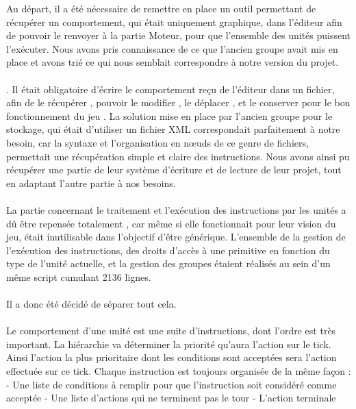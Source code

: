 \documentclass{report}
\begin{document}
Au départ, il a été nécessaire de remettre en place un outil permettant de récupérer un comportement, qui était uniquement graphique, dans l'éditeur afin de pouvoir le renvoyer à la partie Moteur, pour que l'ensemble des unités puissent l'exécuter.
Nous avons pris connaissance de ce que l'ancien groupe avait mis en place et avons trié ce qui nous semblait correspondre à notre version du projet.
\paragraph{}
.
Il était obligatoire d'écrire le comportement reçu de l'éditeur dans un fichier, afin de le récupérer , pouvoir le modifier , le déplacer , et le conserver pour le bon fonctionnement du jeu .
La solution mise en place par l'ancien groupe pour le stockage, qui était d'utiliser un fichier XML correspondait parfaitement à notre besoin, car la syntaxe et l'organisation en nœuds de ce genre de fichiers, permettait une récupération simple et claire des instructions. Nous avons ainsi pu récupérer une partie de leur système d'écriture et de lecture de leur projet, tout en adaptant l'autre partie à nos besoins.
\paragraph{}
La partie concernant le traitement et l'exécution des instructions par les unités a dû être repensée totalement , car même si elle fonctionnait pour leur vision du jeu, était inutilisable dans l’objectif d’être générique. 
L’ensemble de la gestion de l'exécution des instructions, des droits d’accès à une primitive en fonction du type de l’unité actuelle, et la gestion des groupes étaient réalisés au sein d’un même script cumulant 2136 lignes.
\paragraph{}
Il a donc été décidé de séparer tout cela.
\paragraph{}
Le comportement d'une unité est une suite d'instructions, dont l'ordre est très important. La hiérarchie va déterminer la priorité qu'aura l'action sur le tick. Ainsi l'action la plus prioritaire dont les conditions sont acceptées sera l'action effectuée sur ce tick.
Chaque instruction est toujours organisée de la même façon :
- Une liste de conditions à remplir pour que l'instruction soit considéré comme acceptée
- Une liste d'actions qui ne terminent pas le tour
- L'action terminale
\end{document}
